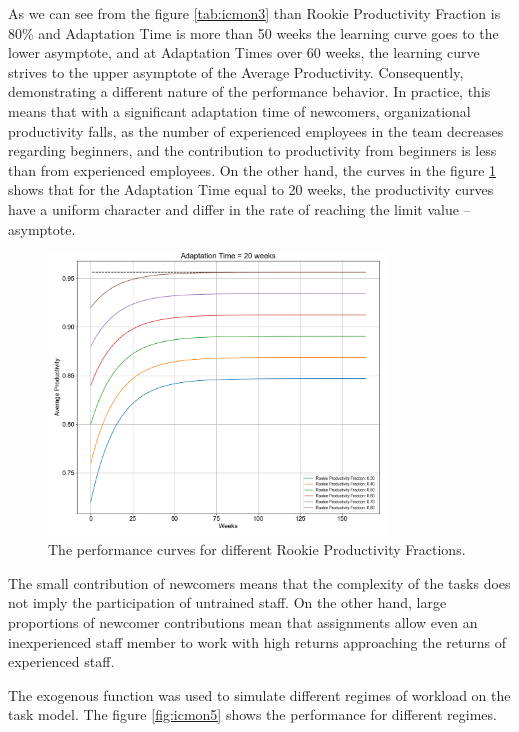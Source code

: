 \documentclass[12pt]{report}
\theoremstyle{definition}
\begin{document}
As we can see from the figure \ref{tab:icmon3} than Rookie Productivity Fraction is 80\%  and Adaptation Time is more than 50 weeks the learning curve goes to the lower asymptote, and at Adaptation Times over 60 weeks, the learning curve strives to the upper asymptote of the Average Productivity.
Consequently, demonstrating a different nature of the performance behavior. 
In practice, this means that with a significant adaptation time of newcomers, organizational productivity falls, as the number of experienced employees in the team decreases regarding beginners, and the contribution to productivity from beginners is less than from experienced employees.
On the other hand, the curves in the figure \ref{fig:icmon4} shows that for the Adaptation Time equal to 20 weeks, the productivity curves have a uniform character and differ in the rate of reaching the limit value – asymptote.

\begin{figure}[ht]
	\centering
	\includegraphics[width=0.8\textwidth]{icmon4}
	\caption{The performance curves for different Rookie Productivity Fractions.}
	\label{fig:icmon4}
\end{figure} 

The small contribution of newcomers means that the complexity of the tasks does not imply the participation of untrained staff. 
On the other hand, large proportions of newcomer contributions mean that assignments allow even an inexperienced staff member to work with high returns approaching the returns of experienced staff.

The exogenous function was used to simulate different regimes of workload on the task model.
The figure \ref{fig:icmon5} shows the performance for different regimes.
\end{document}
